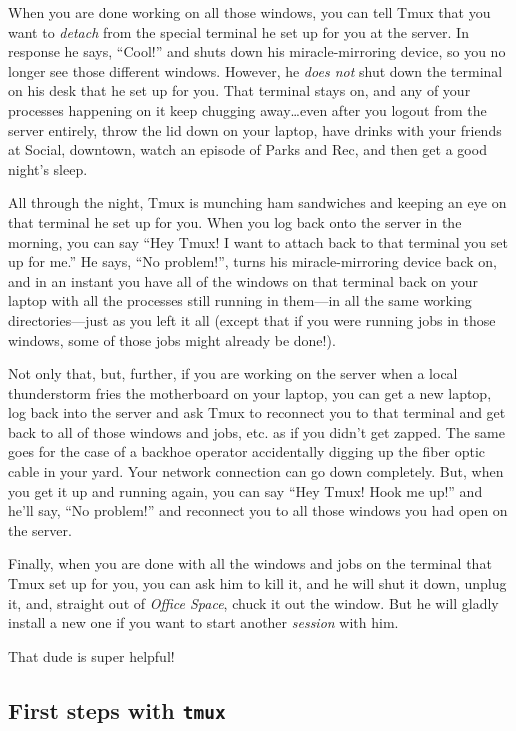 \documentclass[]{krantz}
\begin{document}
When you are done working on all those windows, you can tell Tmux that you
want to \emph{detach} from the special terminal he set up for you at the server.
In response he says, ``Cool!'' and shuts down his miracle-mirroring device, so
you no longer see those different windows. However, he \emph{does not} shut down the
terminal on his desk that he set up for you. That terminal stays on, and any of your processes
happening on it keep chugging away\ldots{}even after you logout from the server entirely,
throw the lid down on your laptop,
have drinks with your friends at Social, downtown, watch an episode
of Parks and Rec, and then get a good night's sleep.

All through the night, Tmux is munching ham sandwiches and keeping an eye on that
terminal he set up for you. When you log back onto the server in the morning, you
can say ``Hey Tmux! I want to attach back to that terminal you set up for me.'' He
says, ``No problem!'', turns his miracle-mirroring device back on, and in an instant
you have all of the windows on that terminal back on your laptop with all the processes
still running in them---in all the same working directories---just as you left it all
(except that if you were running jobs in those windows, some of those jobs might already
be done!).

Not only that, but, further, if you are working on the server when a local thunderstorm
fries the motherboard on your laptop, you can get a new laptop, log back into the
server and ask Tmux to reconnect you to that terminal and get back to all of those
windows and jobs, etc. as if you didn't get zapped. The same goes for the case of
a backhoe operator accidentally digging up the fiber optic cable in your yard. Your
network connection can go down completely. But, when you get it up and running again,
you can say ``Hey Tmux! Hook me up!'' and he'll say, ``No problem!'' and reconnect you
to all those windows you had open on the server.

Finally, when you are done with all the windows and jobs on the terminal that Tmux set
up for you, you can ask him to kill it, and he will shut it down, unplug it, and, straight
out of \emph{Office Space}, chuck it out the window. But he will gladly install a new one
if you want to start another \emph{session} with him.

That dude is super helpful!

\hypertarget{first-steps-with-tmux}{%
\subsection{\texorpdfstring{First steps with \texttt{tmux}}{First steps with tmux}}\label{first-steps-with-tmux}}
\end{document}
